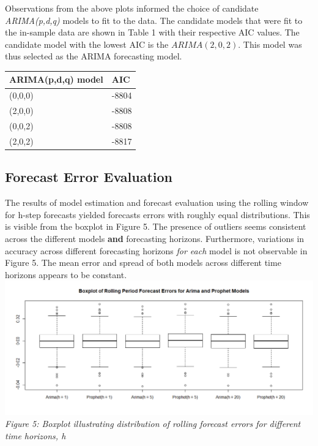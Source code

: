 \documentclass[12pt,a4paper]{article}
\numberwithin{equation}{section}
\numberwithin{figure}{section}
\numberwithin{table}{section}
\let\origtable\table
\let\endorigtable\endtable
\renewenvironment{table}[1][2] {
    \expandafter\origtable\expandafter[H]
} {
    \endorigtable
}
\begin{document}
Observations from the above plots informed the choice of candidate
\emph{ARIMA(p,d,q)} models to fit to the data. The candidate models that
were fit to the in-sample data are shown in Table 1 with their
respective AIC values. The candidate model with the lowest AIC is the
\(ARIMA(2,0,2)\). This model was thus selected as the ARIMA forecasting
model.

\begin{table}[H]
\centering
\begin{tabular}{ll}
  \hline
ARIMA(p,d,q) model & AIC \\ 
  \hline
(0,0,0) & -8804 \\ 
  (2,0,0) & -8808 \\ 
  (0,0,2) & -8808 \\ 
  (2,0,2) & -8817 \\ 
   \hline
\end{tabular}
\caption{AIC for Candidate ARIMA models} 
\end{table}

\subsection{Forecast Error Evaluation}\label{forecast-error-evaluation}

The results of model estimation and forecast evaluation using the
rolling window for h-step forecasts yielded forecasts errors with
roughly equal distributions. This is visible from the boxplot in Figure
5. The presence of outliers seems consistent across the different models
\textbf{and} forecasting horizons. Furthermore, variations in accuracy
across different forecasting horizons \emph{for each} model is not
observable in Figure 5. The mean error and spread of both models across
different time horizons appears to be constant.
\includegraphics[width=1.05000\textwidth]{Forecast error boxplot.png}\\
\emph{Figure 5: Boxplot illustrating distribution of rolling forecast
errors for different time horizons, h}
\end{document}
